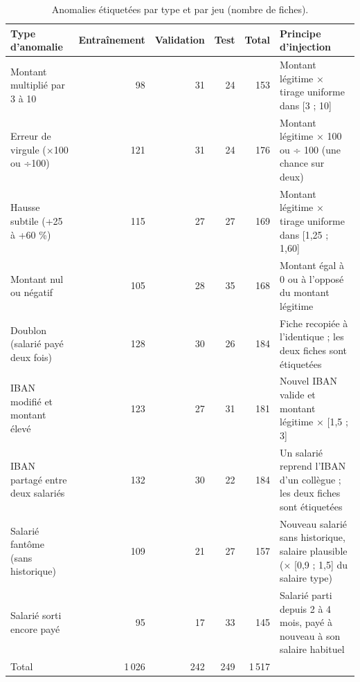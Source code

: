 \begin{table}[htbp]
\centering
\caption{Anomalies étiquetées par type et par jeu (nombre de fiches).}
\label{tab:anomalies_par_type}
\small
\begin{tabular}{lrrrrp{6cm}}
\toprule
\textbf{Type d'anomalie} & \textbf{Entraînement} & \textbf{Validation} & \textbf{Test} & \textbf{Total} & \textbf{Principe d'injection} \\
\midrule
Montant multiplié par 3 à 10 & 98 & 31 & 24 & 153 & Montant légitime × tirage uniforme dans [3 ; 10] \\
Erreur de virgule (×100 ou ÷100) & 121 & 31 & 24 & 176 & Montant légitime × 100 ou ÷ 100 (une chance sur deux) \\
Hausse subtile (+25 à +60 \%) & 115 & 27 & 27 & 169 & Montant légitime × tirage uniforme dans [1,25 ; 1,60] \\
Montant nul ou négatif & 105 & 28 & 35 & 168 & Montant égal à 0 ou à l'opposé du montant légitime \\
Doublon (salarié payé deux fois) & 128 & 30 & 26 & 184 & Fiche recopiée à l'identique ; les deux fiches sont étiquetées \\
IBAN modifié et montant élevé & 123 & 27 & 31 & 181 & Nouvel IBAN valide et montant légitime × [1,5 ; 3] \\
IBAN partagé entre deux salariés & 132 & 30 & 22 & 184 & Un salarié reprend l'IBAN d'un collègue ; les deux fiches sont étiquetées \\
Salarié fantôme (sans historique) & 109 & 21 & 27 & 157 & Nouveau salarié sans historique, salaire plausible (× [0,9 ; 1,5] du salaire type) \\
Salarié sorti encore payé & 95 & 17 & 33 & 145 & Salarié parti depuis 2 à 4 mois, payé à nouveau à son salaire habituel \\
Total & 1\,026 & 242 & 249 & 1\,517 &  \\
\bottomrule
\end{tabular}
\end{table}
